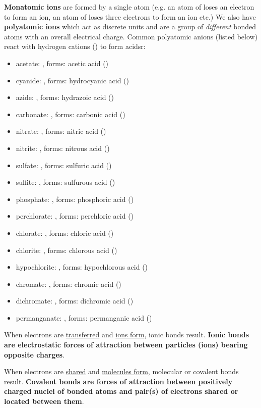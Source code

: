 \documentclass{article}
\begin{document}
\textbf{Monatomic ions} are formed by a single atom (e.g. an atom of  loses an electron to form an  ion, an atom of  loses three electrons to form an  ion etc.) We also have \textbf{polyatomic ions} which act as discrete units and are a group of \emph{different} bonded atoms with an overall electrical charge. Common polyatomic anions (listed below) react with hydrogen cations () to form acidsr:
\begin{itemize}
    \item acetate: , forms: acetic acid ()
    \item cyanide: , forms: hydrocyanic acid ()
    \item azide: , forms: hydrazoic acid ()
    \item carbonate: , forms: carbonic acid ()
    \item nitrate: , forms: nitric acid ()
    \item nitrite: , forms: nitrous acid ()
    \item sulfate: , forms: sulfuric acid ()
    \item sulfite: , forms: sulfurous acid ()
    \item phosphate: , forms: phosphoric acid ()
    \item perchlorate: , forms: perchloric acid ()
    \item chlorate: , forms: chloric acid ()
    \item chlorite: , forms: chlorous acid ()
    \item hypochlorite: , forms: hypochlorous acid ()
    \item chromate: , forms: chromic acid ()
    \item dichromate: , forms: dichromic acid ()
    \item permanganate: , forms: permanganic acid ()
\end{itemize}

When electrons are \underline{transferred} and \underline{ions form}, ionic bonds result. \textbf{Ionic bonds are electrostatic forces of attraction between particles (ions) bearing opposite charges}.

When electrons are \underline{shared} and \underline{molecules form}, molecular or covalent bonds result. \textbf{Covalent bonds are forces of attraction between positively charged nuclei of bonded atoms and pair(s) of electrons shared or located between them}.
\end{document}
